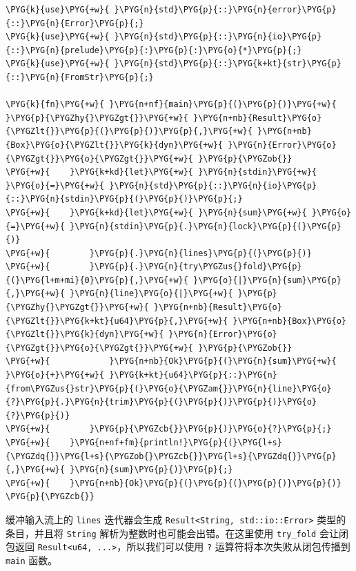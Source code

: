 \begin{Verbatim}[commandchars=\\\{\},breaklines=true,breakanywhere=true,fontsize=\codefont,xleftmargin=17bp]
\PYG{k}{use}\PYG{+w}{ }\PYG{n}{std}\PYG{p}{::}\PYG{n}{error}\PYG{p}{::}\PYG{n}{Error}\PYG{p}{;}
\PYG{k}{use}\PYG{+w}{ }\PYG{n}{std}\PYG{p}{::}\PYG{n}{io}\PYG{p}{::}\PYG{n}{prelude}\PYG{p}{:}\PYG{p}{:}\PYG{o}{*}\PYG{p}{;}
\PYG{k}{use}\PYG{+w}{ }\PYG{n}{std}\PYG{p}{::}\PYG{k+kt}{str}\PYG{p}{::}\PYG{n}{FromStr}\PYG{p}{;}

\PYG{k}{fn}\PYG{+w}{ }\PYG{n+nf}{main}\PYG{p}{(}\PYG{p}{)}\PYG{+w}{ }\PYG{p}{\PYGZhy{}\PYGZgt{}}\PYG{+w}{ }\PYG{n+nb}{Result}\PYG{o}{\PYGZlt{}}\PYG{p}{(}\PYG{p}{)}\PYG{p}{,}\PYG{+w}{ }\PYG{n+nb}{Box}\PYG{o}{\PYGZlt{}}\PYG{k}{dyn}\PYG{+w}{ }\PYG{n}{Error}\PYG{o}{\PYGZgt{}}\PYG{o}{\PYGZgt{}}\PYG{+w}{ }\PYG{p}{\PYGZob{}}
\PYG{+w}{    }\PYG{k+kd}{let}\PYG{+w}{ }\PYG{n}{stdin}\PYG{+w}{ }\PYG{o}{=}\PYG{+w}{ }\PYG{n}{std}\PYG{p}{::}\PYG{n}{io}\PYG{p}{::}\PYG{n}{stdin}\PYG{p}{(}\PYG{p}{)}\PYG{p}{;}
\PYG{+w}{    }\PYG{k+kd}{let}\PYG{+w}{ }\PYG{n}{sum}\PYG{+w}{ }\PYG{o}{=}\PYG{+w}{ }\PYG{n}{stdin}\PYG{p}{.}\PYG{n}{lock}\PYG{p}{(}\PYG{p}{)}
\PYG{+w}{        }\PYG{p}{.}\PYG{n}{lines}\PYG{p}{(}\PYG{p}{)}
\PYG{+w}{        }\PYG{p}{.}\PYG{n}{try\PYGZus{}fold}\PYG{p}{(}\PYG{l+m+mi}{0}\PYG{p}{,}\PYG{+w}{ }\PYG{o}{|}\PYG{n}{sum}\PYG{p}{,}\PYG{+w}{ }\PYG{n}{line}\PYG{o}{|}\PYG{+w}{ }\PYG{p}{\PYGZhy{}\PYGZgt{}}\PYG{+w}{ }\PYG{n+nb}{Result}\PYG{o}{\PYGZlt{}}\PYG{k+kt}{u64}\PYG{p}{,}\PYG{+w}{ }\PYG{n+nb}{Box}\PYG{o}{\PYGZlt{}}\PYG{k}{dyn}\PYG{+w}{ }\PYG{n}{Error}\PYG{o}{\PYGZgt{}}\PYG{o}{\PYGZgt{}}\PYG{+w}{ }\PYG{p}{\PYGZob{}}
\PYG{+w}{            }\PYG{n+nb}{Ok}\PYG{p}{(}\PYG{n}{sum}\PYG{+w}{ }\PYG{o}{+}\PYG{+w}{ }\PYG{k+kt}{u64}\PYG{p}{::}\PYG{n}{from\PYGZus{}str}\PYG{p}{(}\PYG{o}{\PYGZam{}}\PYG{n}{line}\PYG{o}{?}\PYG{p}{.}\PYG{n}{trim}\PYG{p}{(}\PYG{p}{)}\PYG{p}{)}\PYG{o}{?}\PYG{p}{)}
\PYG{+w}{        }\PYG{p}{\PYGZcb{}}\PYG{p}{)}\PYG{o}{?}\PYG{p}{;}
\PYG{+w}{    }\PYG{n+nf+fm}{println!}\PYG{p}{(}\PYG{l+s}{\PYGZdq{}}\PYG{l+s}{\PYGZob{}\PYGZcb{}}\PYG{l+s}{\PYGZdq{}}\PYG{p}{,}\PYG{+w}{ }\PYG{n}{sum}\PYG{p}{)}\PYG{p}{;}
\PYG{+w}{    }\PYG{n+nb}{Ok}\PYG{p}{(}\PYG{p}{(}\PYG{p}{)}\PYG{p}{)}
\PYG{p}{\PYGZcb{}}
\end{Verbatim}

缓冲输入流上的 \texttt{lines} 迭代器会生成 \texttt{Result<String, std::io::Error>} 类型的条目，并且将 \texttt{String} 解析为整数时也可能会出错。在这里使用 \texttt{try\_fold} 会让闭包返回 \texttt{Result<u64, ...>}，所以我们可以使用 \texttt{?} 运算符将本次失败从闭包传播到 \texttt{main} 函数。

